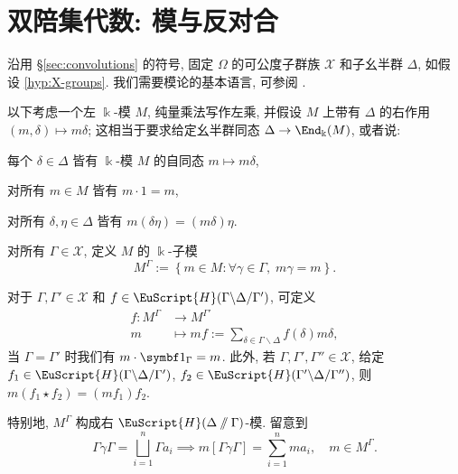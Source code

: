\section{双陪集代数: 模与反对合}\label{sec:convolution-modules}
沿用 \S\ref{sec:convolutions} 的符号, 固定 $\Omega$ 的可公度子群族 $\mathcal{X}$ 和子幺半群 $\Delta$, 如假设 \ref{hyp:X-groups}. 我们需要模论的基本语言, 可参阅 \cite[\S 6.1]{Li1}.

\begin{hypothesis}\label{hyp:M-space}
	以下考虑一个左 $\Bbbk$-模 $M$, 纯量乘法写作左乘, 并假设 $M$ 上带有 $\Delta$ 的右作用 $(m,\delta) \mapsto m \delta$; 这相当于要求给定幺半群同态 $\Delta \to \End_\Bbbk(M)$, 或者说:
	\begin{compactitem}
		\item 每个 $\delta \in \Delta$ 皆有 $\Bbbk$-模 $M$ 的自同态 $m \mapsto m \delta$,
		\item 对所有 $m \in M$ 皆有 $m \cdot 1 = m$,
		\item 对所有 $\delta, \eta \in \Delta$ 皆有 $m (\delta\eta) = (m  \delta) \eta$.
	\end{compactitem}
\end{hypothesis}

对所有 $\Gamma \in \mathcal{X}$, 定义 $M$ 的 $\Bbbk$-子模
\[ M^\Gamma := \left\{ m \in M: \forall \gamma \in \Gamma,\; m\gamma = m \right\}. \]

\begin{definition-theorem}\label{def:Hecke-action}
	对于 $\Gamma, \Gamma' \in \mathcal{X}$ 和 $f \in \EuScript{H}(\Gamma \backslash \Delta / \Gamma')$, 可定义
	\begin{align*}
		f: M^\Gamma & \longrightarrow M^{\Gamma'} \\
		m & \longmapsto m f := \sum_{\delta \in \Gamma \backslash \Delta} f(\delta) m\delta,
	\end{align*}
	当 $\Gamma=\Gamma'$ 时我们有 $m \cdot \charfcn_{\Gamma} = m$. 此外, 若 $\Gamma, \Gamma', \Gamma'' \in \mathcal{X}$, 给定 $f_1 \in \EuScript{H}(\Gamma \backslash \Delta / \Gamma')$, $f_2 \in \EuScript{H}(\Gamma' \backslash \Delta /\Gamma'')$, 则 $m(f_1 \star f_2) = (mf_1)f_2$.
\end{definition-theorem}
特别地, $M^\Gamma$ 构成右 $\EuScript{H}(\Delta \sslash \Gamma)$-模. 留意到
\[ \Gamma\gamma\Gamma = \bigsqcup_{i=1}^n \Gamma a_i \implies  m[\Gamma \gamma \Gamma] = \sum_{i=1}^n m a_i, \quad m \in M^\Gamma. \]

